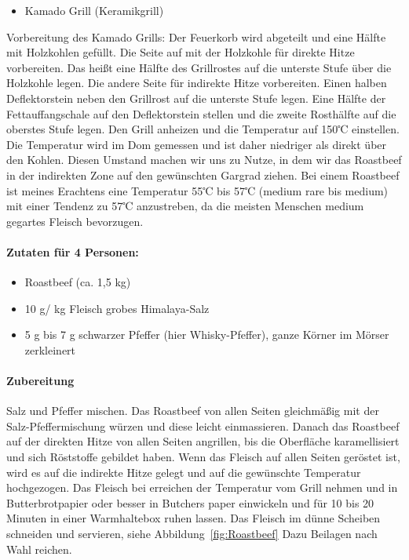 \begin{itemize}[noitemsep]
	\item Kamado Grill (Keramikgrill)
\end{itemize}


Vorbereitung des Kamado Grills: Der Feuerkorb wird abgeteilt und eine Hälfte
mit Holzkohlen gefüllt. Die Seite auf mit der 
Holzkohle für direkte Hitze
vorbereiten. Das heißt eine Hälfte des Grillrostes auf die unterste Stufe 
über die Holzkohle legen. Die andere Seite für indirekte Hitze vorbereiten. 
Einen halben Deflektorstein neben den Grillrost auf die unterste Stufe 
legen. Eine Hälfte der Fettauffangschale auf den Deflektorstein stellen 
und die zweite Rosthälfte auf die oberstes Stufe legen. Den Grill anheizen 
und die Temperatur auf 150℃ einstellen. Die Temperatur wird im Dom 
gemessen
und ist daher niedriger als direkt über den Kohlen. Diesen Umstand 
machen
wir uns zu Nutze, in dem wir das Roastbeef in der indirekten Zone auf den
gewünschten Gargrad ziehen. Bei einem Roastbeef ist meines Erachtens
eine Temperatur 55℃ bis 57℃ (medium rare bis medium) mit einer 
Tendenz
zu 57℃ anzustreben, da die meisten Menschen medium gegartes Fleisch
bevorzugen.

\paragraph{Zutaten für 4 Personen:}

\begin{itemize}[noitemsep]
	\item Roastbeef (ca. 1,5 kg)
	\item 10 g/ kg Fleisch grobes Himalaya-Salz
	\item 5 g bis 7 g schwarzer Pfeffer (hier Whisky-Pfeffer), ganze Körner 
	im Mörser zerkleinert
\end{itemize}

\paragraph{Zubereitung}

Salz und Pfeffer mischen. Das Roastbeef von allen Seiten gleichmäßig mit 
der Salz-Pfeffermischung würzen und diese leicht einmassieren. Danach
das Roastbeef auf der direkten Hitze von allen Seiten angrillen, bis die
Oberfläche karamellisiert und sich Röststoffe gebildet haben. Wenn das
Fleisch auf allen Seiten geröstet ist, wird es auf die indirekte Hitze 
gelegt
und auf die gewünschte Temperatur hochgezogen. Das Fleisch bei 
erreichen
der Temperatur vom Grill nehmen und in Butterbrotpapier oder besser in
Butchers paper einwickeln und für 10 bis 20 Minuten in einer 
Warmhaltebox
ruhen lassen. Das Fleisch im dünne Scheiben schneiden und servieren, 
siehe Abbildung~\vref{fig:Roastbeef}
Dazu Beilagen nach Wahl reichen.

